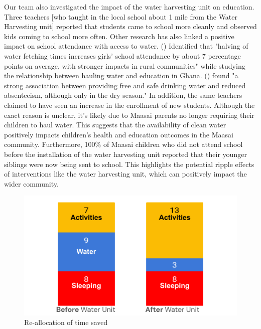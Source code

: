 \documentclass[10pt, twocolumn]{article}
\begin{document}
Our team also investigated the impact of the water harvesting unit on education. Three teachers [who taught in the local school about 1 mile from the Water Harvesting unit] reported that students came to school more cleanly and observed kids coming to school more often. Other research has also linked a positive impact on school attendance with access to water. (\autocite{Nauges2017}) Identified that "halving of water fetching times increases girls’ school attendance by about 7 percentage points on average, with stronger impacts in rural communities" while studying the relationship between hauling water and education in Ghana. (\autocite{Cambodia_Water_Education}) found "a strong association between providing free and safe drinking water and reduced absenteeism, although only in the dry season." In addition, the same teachers claimed to have seen an increase in the enrollment of new students. Although the exact reason is unclear, it's likely due to Maasai parents no longer requiring their children to haul water. This suggests that the availability of clean water positively impacts children's health and education outcomes in the Maasai community. Furthermore, 100\% of Maasai children who did not attend school before the installation of the water harvesting unit reported that their younger siblings were now being sent to school. This highlights the potential ripple effects of interventions like the water harvesting unit, which can positively impact the wider community. 

\begin{figure} [H]
    \centering
    \includegraphics[width=1\linewidth]{photos/time_reallocation.png}
    \caption{Re-allocation of time saved}
    \label{fig:reallocation}
\end{figure}
\end{document}

